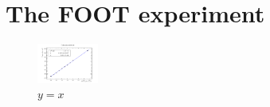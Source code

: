 \chapter{The FOOT experiment}

\lipsum[1-3]

\begin{figure}
    \centering
        \includegraphics[width=2cm]{figures/ch0.pdf}
        \caption{$y=x$}
        \label{fig:y equals x}
\end{figure}






